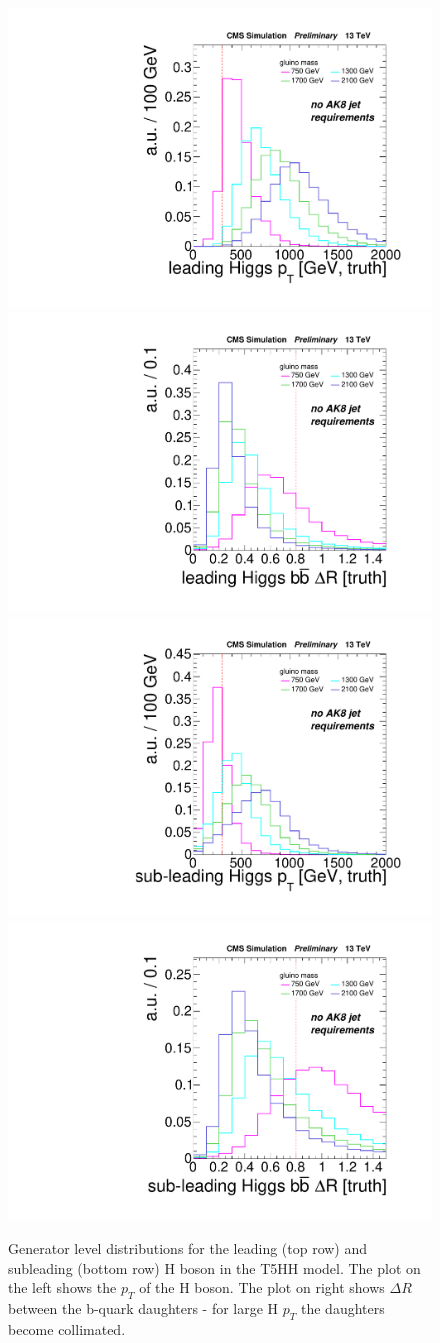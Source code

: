 \begin{figure}
\centering
\includegraphics[width=0.45\linewidth]{figs/SUS17006/leadHiggsPt.pdf}
\includegraphics[width=0.45\linewidth]{figs/SUS17006/leadHiggsDr.pdf}\\
\includegraphics[width=0.45\linewidth]{figs/SUS17006/subleadHiggsPt.pdf}
\includegraphics[width=0.45\linewidth]{figs/SUS17006/subleadHiggsDr.pdf}\\
\caption{
Generator level distributions for the leading (top row) and subleading (bottom row) H boson in the T5HH model. The plot on the left shows the $p_{T}$ of the H boson. The plot on right shows $\Delta R$ between the b-quark daughters - for large H $p_{T}$ the daughters become collimated.
}
\label{fig:GenHiggsBoost}
\end{figure}

